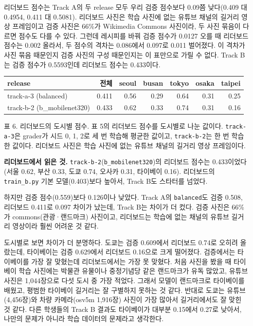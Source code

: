 \documentclass[11pt]{article}
\begin{document}
리더보드 점수는 Track A의 두 release 모두 우리 검증 점수보다 0.09쯤 낮다(0.409 대 0.4954, 0.411 대
0.5081). 리더보드 사진은 학습 사진에 없는 유튜브 채널의 길거리 영상 프레임이고 검증 사진은
66\%가 Wikimedia Commons 사진이라, 두 사진 묶음이 다르면 점수도 다를 수 있다. 그런데
레시피를 바꿔 검증 점수가 0.0127 오를 때 리더보드 점수는 0.002 올라서, 두 점수의 격차는
0.086에서 0.097로 0.011 벌어졌다. 이 격차가 사진 묶음 때문인지 검증 사진의 구성 때문인지는
이 표만으로 가릴 수 없다. Track B는 검증 점수가 0.5593인데 리더보드 점수는
0.433이다.

\begin{center}\footnotesize
\begin{tabular}{lrrrrrr}
\toprule
release & 전체 & seoul & busan & tokyo & osaka & taipei \\
\midrule
track-a-3 (balanced) & 0.411 & 0.56 & 0.29 & 0.64 & 0.31 & 0.25 \\
track-b-2 (b\_mobilenet320) & 0.433 & 0.62 & 0.33 & 0.74 & 0.31 & 0.16 \\
\bottomrule
\end{tabular}

{\footnotesize 표 6. 리더보드의 도시별 점수. 표 5의 리더보드 점수를 도시별로 나눈 값이다. \texttt{track-a-3}은 grader가 시드 0, 1, 2로 세 번 학습해 평균한 값이고, \texttt{track-b-2}는 한 번 학습한 값이다. 리더보드 사진은 학습 사진에 없는 유튜브 채널의 길거리 영상 프레임이다.}
\end{center}

\textbf{리더보드에서 읽은 것.} \texttt{track-b-2}(\texttt{b\_mobilenet320})의 리더보드 점수는
0.433이었다(서울 0.62, 부산 0.33, 도쿄 0.74, 오사카 0.31, 타이베이 0.16). 리더보드의
\texttt{train\_b.py} 기본 모델(0.403)보다 높아서, Track B도 스타터를 넘었다.

하지만 검증 점수(0.559)보다 0.126이나 낮았다. Track A의 \texttt{balanced}도 검증 0.508,
리더보드 0.411로 0.097 차이가 났는데, Track B는 차이가 더 컸다. 검증 사진은 66\%가
commons(관광·랜드마크) 사진이고, 리더보드는 학습에 없는 채널의 유튜브 길거리 영상이라
훨씬 어려운 것 같다.

도시별로 보면 차이가 더 분명하다. 도쿄는 검증 0.609에서 리더보드 0.74로 오히려 올랐는데,
타이베이는 검증 0.629에서 리더보드 0.16으로 크게 떨어졌다. 검증에서는 타이베이를 가장 잘
맞혔는데 리더보드에서는 가장 못 맞혔다. 처음 사진을 봤을 때 타이베이 학습 사진에는 박물관
유물이나 중정기념당 같은 랜드마크가 유독 많았고, 유튜브 사진은 1,044장으로 다섯 도시 중
가장 적었다. 그래서 모델이 랜드마크로 타이베이를 배웠고, 평범한 타이베이 길거리는 잘
구별하지 못하는 것 같다. 반대로 도쿄는 유튜브(4,456장)와 차량 카메라(osv5m 1,916장) 사진이
가장 많아서 길거리에서도 잘 맞힌 것 같다. 다른 학생들의 Track B 결과도 타이베이가 대부분
0.15에서 0.27로 낮아서, 나만의 문제가 아니라 학습 데이터의 문제라고 생각한다.
\end{document}
